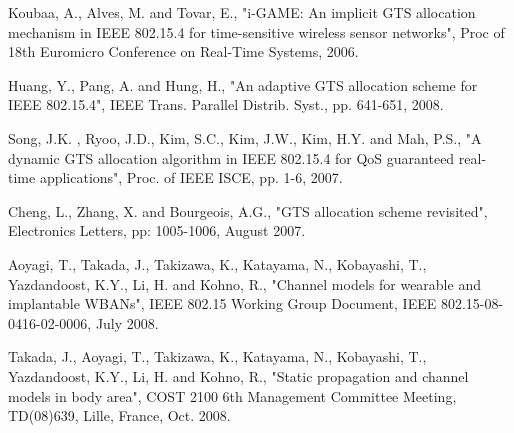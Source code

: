 \documentclass[letterpaper]{sig-alternate-10pt}
\begin{document}
\begin{thebibliography}{1}
Koubaa, A., Alves, M. and Tovar, E., "i-GAME: An implicit GTS allocation mechanism in IEEE 802.15.4 for time-sensitive wireless sensor networks", Proc of 18th Euromicro Conference on Real-Time Systems, 2006.

Huang, Y., Pang, A. and Hung, H., "An adaptive GTS allocation scheme for IEEE 802.15.4", IEEE Trans. Parallel Distrib. Syst., pp. 641-651, 2008.

Song, J.K. , Ryoo, J.D., Kim, S.C., Kim, J.W., Kim, H.Y. and Mah, P.S., "A dynamic GTS allocation algorithm in IEEE 802.15.4 for QoS guaranteed real-time applications", Proc. of IEEE ISCE, pp. 1-6, 2007.

Cheng, L., Zhang, X. and Bourgeois, A.G., "GTS allocation scheme revisited", Electronics Letters, pp: 1005-1006, August 2007.

Aoyagi, T., Takada, J., Takizawa, K., Katayama, N., Kobayashi, T., Yazdandoost, K.Y., Li, H. and Kohno, R., "Channel models for wearable and implantable WBANs", IEEE 802.15 Working Group Document, IEEE 802.15-08-0416-02-0006, July 2008.

Takada, J., Aoyagi, T., Takizawa, K., Katayama, N., Kobayashi, T., Yazdandoost, K.Y., Li, H. and Kohno, R., "Static propagation and channel models in body area", COST 2100 6th Management Committee Meeting, TD(08)639, Lille, France, Oct. 2008.


\end{thebibliography}
\end{document}
